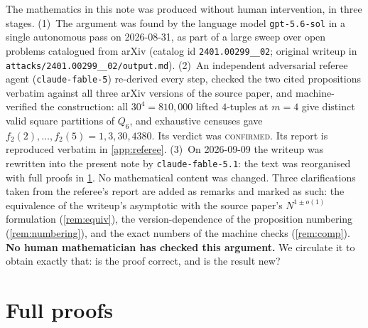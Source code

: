 \documentclass[11pt,a4paper]{article}
\theoremstyle{plain}
\theoremstyle{definition}
\theoremstyle{remark}
\begin{document}
The mathematics in this note was produced without human intervention, in three stages.
(1)~The argument was found by the language model \texttt{gpt-5.6-sol} in a single autonomous pass on 2026-08-31, as part of a large sweep over open problems catalogued from arXiv (catalog id \texttt{2401.00299\_\_02}; original writeup in \texttt{attacks/2401.00299\_\_02/output.md}).
(2)~An independent adversarial referee agent (\texttt{claude-fable-5}) re-derived every step, checked the two cited propositions verbatim against all three arXiv versions of the source paper, and machine-verified the construction: all $30^4=810{,}000$ lifted $4$-tuples at $m=4$ give distinct valid square partitions of $Q_6$, and exhaustive censuses gave $f_2(2),\dots,f_2(5)=1,3,30,4380$. Its verdict was \textsc{confirmed}. Its report is reproduced verbatim in \cref{app:referee}.
(3)~On 2026-09-09 the writeup was rewritten into the present note by \texttt{claude-fable-5.1}: the text was reorganised with full proofs in \cref{app:proofs}. No mathematical content was changed. Three clarifications taken from the referee's report are added as remarks and marked as such: the equivalence of the writeup's asymptotic with the source paper's $N^{1\pm o(1)}$ formulation (\cref{rem:equiv}), the version-dependence of the proposition numbering (\cref{rem:numbering}), and the exact numbers of the machine checks (\cref{rem:comp}).
\textbf{No human mathematician has checked this argument.} We circulate it to obtain exactly that: is the proof correct, and is the result new?


\appendix

\section{Full proofs}\label{app:proofs}
\end{document}
